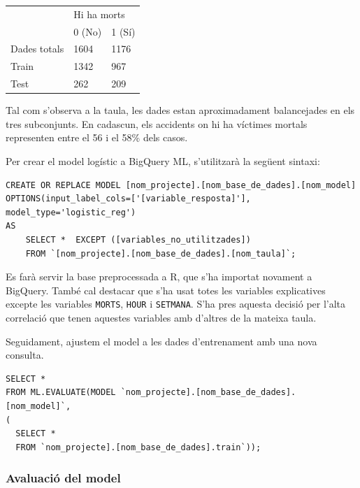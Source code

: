 \documentclass[12pt,longbibliography]{article}
\theoremstyle{definition}
\theoremstyle{remark}
\begin{document}
\begin{table}[H]
\centering
\begin{tabular}{l|ll|}
\cline{2-3}
                                   & \multicolumn{2}{l|}{Hi ha morts}     \\ \cline{2-3} 
                                   & \multicolumn{1}{l|}{0 (No)} & 1 (Sí) \\ \hline
\multicolumn{1}{|l|}{Dades totals} & \multicolumn{1}{l|}{1604}   & 1176   \\ \hline
\multicolumn{1}{|l|}{Train}        & \multicolumn{1}{l|}{1342}   & 967    \\ \hline
\multicolumn{1}{|l|}{Test}         & \multicolumn{1}{l|}{262}    & 209    \\ \hline
\end{tabular}
\label{tab:ent1}
\end{table}


Tal com s'observa a la taula, les dades estan aproximadament balancejades en els tres subconjunts. En cadascun, els accidents on hi ha víctimes mortals representen entre el 56 i el 58\% dels casos.


Per crear el model logístic a BigQuery ML, s'utilitzarà la següent sintaxi:


\begin{verbatim}
CREATE OR REPLACE MODEL [nom_projecte].[nom_base_de_dades].[nom_model] 
OPTIONS(input_label_cols=['[variable_resposta]'], model_type='logistic_reg') 
AS 
	SELECT *  EXCEPT ([variables_no_utilitzades])
	FROM `[nom_projecte].[nom_base_de_dades].[nom_taula]`;
\end{verbatim}


Es farà servir la base preprocessada a R, que s'ha importat novament a BigQuery. També cal destacar que s'ha usat totes les variables explicatives excepte les variables \texttt{MORTS}, \texttt{HOUR} i \texttt{SETMANA}. S'ha pres aquesta decisió per l'alta correlació que tenen aquestes variables amb d'altres de la mateixa taula. 

Seguidament, ajustem el model a les dades d'entrenament amb una nova consulta.


\begin{verbatim}
SELECT *
FROM ML.EVALUATE(MODEL `nom_projecte].[nom_base_de_dades].[nom_model]`, 
(
  SELECT * 
  FROM `nom_projecte].[nom_base_de_dades].train`));
\end{verbatim}


\subsubsection{Avaluació del model}
\end{document}
